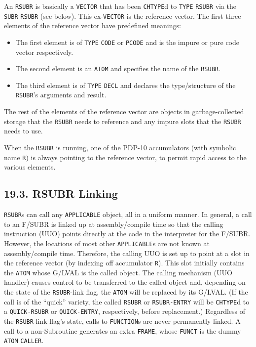 \documentclass[a4paper,]{article}
\providecommand{\tightlist}{%
  \setlength{\itemsep}{0pt}\setlength{\parskip}{0pt}}
\begin{document}
An \texttt{RSUBR} is basically a \texttt{VECTOR} that has been \texttt{CHTYPE}d to \texttt{TYPE} \texttt{RSUBR} via the
\texttt{SUBR} \texttt{RSUBR} (see below). This ex-\texttt{VECTOR} is the reference vector. The first three elements of the
reference vector have predefined meanings:

\begin{itemize}
\tightlist
\item
  The first element is of \texttt{TYPE} \texttt{CODE} or \texttt{PCODE} and is the impure or pure code vector respectively.
\item
  The second element is an \texttt{ATOM} and specifies the name of the \texttt{RSUBR}.
\item
  The third element is of \texttt{TYPE} \texttt{DECL} and declares the type/structure of the \texttt{RSUBR}'s arguments and
  result.
\end{itemize}

The rest of the elements of the reference vector are objects in garbage-collected storage that the \texttt{RSUBR} needs to
reference and any impure slots that the \texttt{RSUBR} needs to use.

When the \texttt{RSUBR} is running, one of the PDP-10 accumulators (with symbolic name \texttt{R}) is always pointing to
the reference vector, to permit rapid access to the various elements.

\subsection{19.3. RSUBR Linking}\label{rsubr-linking}

\texttt{RSUBR}s can call any \texttt{APPLICABLE} object, all in a uniform manner. In general, a call to an F/SUBR is linked
up at assembly/compile time so that the calling instruction (UUO) points directly at the code in the interpreter for the
F/SUBR. However, the locations of most other \texttt{APPLICABLE}s are not known at assembly/compile time. Therefore, the
calling UUO is set up to point at a slot in the reference vector (by indexing off accumulator \texttt{R}). This slot
initially contains the \texttt{ATOM} whose G/LVAL is the called object. The calling mechanism (UUO handler) causes control
to be transferred to the called object and, depending on the state of the \texttt{RSUBR}-link flag, the \texttt{ATOM} will
be replaced by its G/LVAL. (If the call is of the ``quick'' variety, the called \texttt{RSUBR} or \texttt{RSUBR-ENTRY} will
be \texttt{CHTYPE}d to a \texttt{QUICK-RSUBR} or
\texttt{QUICK-ENTRY}, respectively, before replacement.) Regardless of the \texttt{RSUBR}-link
flag's state, calls to \texttt{FUNCTION}s are never permanently linked. A call to a non-Subroutine generates an extra
\texttt{FRAME}, whose \texttt{FUNCT} is the dummy \texttt{ATOM} \texttt{CALLER}.
\end{document}
